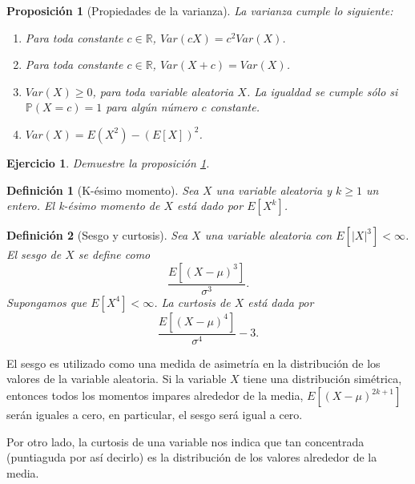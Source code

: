\documentclass[11pt]{report}
\theoremstyle{break}
\newtheorem{definicion}{Definición}[chapter]
\newtheorem{proposicion}{Proposición}[chapter]
\newtheorem{ejercicio}{Ejercicio}[chapter]
\theoremstyle{break}
\begin{document}
\begin{proposicion}[Propiedades de la varianza]
\label{proposicion:propiedades de la varianza}
La varianza cumple lo siguiente:
\begin{enumerate}[label=\alph*)]
\item Para toda constante $c \in \mathbb{R}$, $Var(cX) = c^2Var(X)$.
\item Para toda constante $c \in \mathbb{R}$, $Var(X + c) = Var(X)$.
\item $Var(X) \geq 0$, para toda variable aleatoria $X$. La igualdad se cumple sólo si $\mathbb{P}(X = c)=1$ para algún número $c$ constante.
\item $Var(X) = E(X^2) - (E[X])^2$.
\end{enumerate}
\end{proposicion}

\begin{ejercicio}
Demuestre la proposición \ref{proposicion:propiedades de la varianza}.
\end{ejercicio}

\begin{definicion}[K-ésimo momento]
Sea $X$ una variable aleatoria y $k \geq 1$ un entero. El k-ésimo momento de $X$ está dado por $E[X^k]$.
\end{definicion}

\begin{definicion}[Sesgo y curtosis]
\label{definicion:sesgo y curtosis}
Sea $X$ una variable aleatoria con $E[|X|^3]<\infty$. El sesgo de $X$ se define como
$$
\dfrac{E[(X- \mu)^3]}{\sigma^3}.
$$
Supongamos que $E[X^4] < \infty$. La curtosis de $X$ está dada por
$$
\dfrac{E[(X - \mu)^4]}{\sigma^4} - 3.
$$
\end{definicion}
El sesgo es utilizado como una medida de asimetría en la distribución de los valores de la variable aleatoria. Si la variable $X$ tiene una distribución simétrica, entonces todos los momentos impares alrededor de la media, $E[(X - \mu)^{2k + 1}]$ serán iguales a cero, en particular, el sesgo será igual a cero.

Por otro lado, la curtosis de una variable nos indica que tan concentrada (puntiaguda por así decirlo) es la distribución de los valores alrededor de la media.
\end{document}
